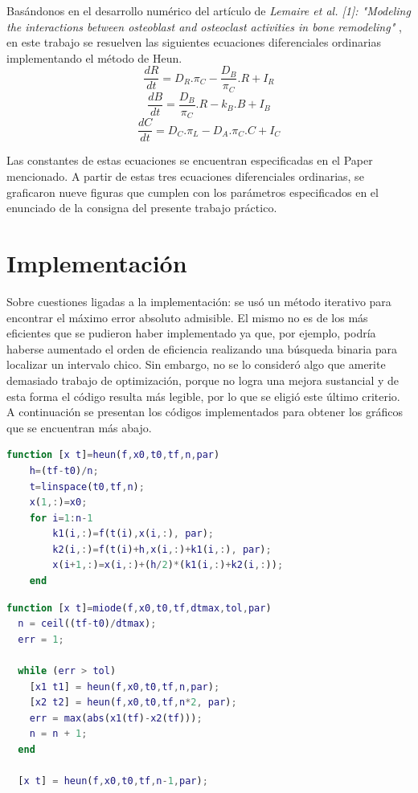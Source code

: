 \hspace{1cm}Bas\'andonos en el desarrollo num\'erico del art\'iculo de \textit{Lemaire et al. [1]: "Modeling the interactions between osteoblast and osteoclast activities in bone remodeling" }, en este trabajo se resuelven las siguientes ecuaciones diferenciales ordinarias implementando el m\'etodo de Heun.
$$ \frac{dR}{dt} = D_R . \pi_C - \frac{D_B}{\pi_C} . R + I_R$$
$$ \frac{dB}{dt} = \frac{D_B}{\pi_C} . R - k_B . B + I_B$$
$$ \frac{dC}{dt} = D_C . \pi_L - D_A . \pi_C . C + I_C$$

\hspace{1cm}Las constantes de estas ecuaciones se encuentran especificadas en el Paper mencionado. A partir de estas tres ecuaciones diferenciales ordinarias, se graficaron nueve figuras 	que cumplen con los par\'ametros especificados en el enunciado de la consigna del presente trabajo pr\'actico.


\section{Implementaci\'on}

\hspace{1cm}Sobre cuestiones ligadas a la implementación: se usó un método iterativo para encontrar el máximo error absoluto admisible. El mismo no es de los más eficientes que se pudieron haber implementado ya que, por ejemplo, podría haberse aumentado el orden de eficiencia realizando una búsqueda binaria para localizar un intervalo chico. Sin embargo, no se lo consider\'o algo que amerite demasiado trabajo de optimización, porque no logra una mejora sustancial y de esta forma el código resulta más legible, por lo que se eligió este último criterio. A continuaci\'on se presentan los c\'odigos implementados para obtener los gr\'aficos que se encuentran m\'as abajo.

\begin{lstlisting}[language=Matlab, caption=heun.m]
function [x t]=heun(f,x0,t0,tf,n,par)
    h=(tf-t0)/n;
    t=linspace(t0,tf,n);
    x(1,:)=x0;
    for i=1:n-1
        k1(i,:)=f(t(i),x(i,:), par);
        k2(i,:)=f(t(i)+h,x(i,:)+k1(i,:), par);
        x(i+1,:)=x(i,:)+(h/2)*(k1(i,:)+k2(i,:));
    end
\end{lstlisting}

\begin{lstlisting}[language=Matlab, caption=miode.m]
function [x t]=miode(f,x0,t0,tf,dtmax,tol,par)
  n = ceil((tf-t0)/dtmax);
  err = 1;
  
  while (err > tol)
    [x1 t1] = heun(f,x0,t0,tf,n,par); 
    [x2 t2] = heun(f,x0,t0,tf,n*2, par);
    err = max(abs(x1(tf)-x2(tf)));
    n = n + 1;
  end
  
  [x t] = heun(f,x0,t0,tf,n-1,par); 
\end{lstlisting}

